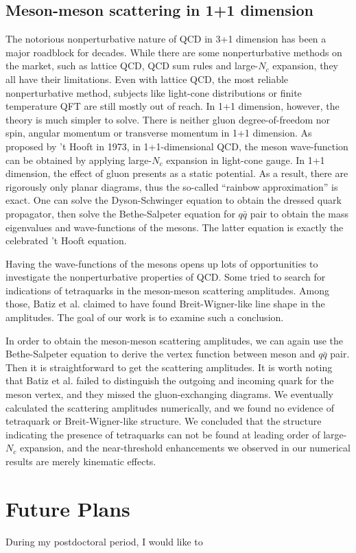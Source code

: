 \documentclass[letterpaper,11pt]{article}
\begin{document}
	\subsection*{Meson-meson scattering in 1+1 dimension}
	The notorious nonperturbative nature of QCD in 3+1 dimension has been a major roadblock for decades. While there are some nonperturbative methods on the market, such as lattice QCD, QCD sum rules and large-$N_c$ expansion, they all have their limitations. Even with lattice QCD, the most reliable nonperturbative method, subjects like light-cone distributions or finite temperature QFT are still mostly out of reach. In 1+1 dimension, however, the theory is much simpler to solve. There is neither gluon degree-of-freedom nor spin, angular momentum or transverse momentum in 1+1 dimension. As proposed by 't Hooft in 1973, in 1+1-dimensional QCD, the meson wave-function can be obtained by applying large-$N_c$ expansion in light-cone gauge. In 1+1 dimension, the effect of gluon presents as a static potential. As a result, there are rigorously only planar diagrams, thus the so-called “rainbow approximation” is exact. One can solve the Dyson-Schwinger equation to obtain the dressed quark propagator, then solve the Bethe-Salpeter equation for $q\bar q$ pair to obtain the mass eigenvalues and wave-functions of the mesons. The latter equation is exactly the celebrated 't Hooft equation. 

    Having the wave-functions of the mesons opens up lots of opportunities to investigate the nonperturbative properties of QCD. Some tried to search for indications of tetraquarks in the meson-meson scattering amplitudes. Among those, Batiz et al. claimed to have found Breit-Wigner-like line shape in the amplitudes. The goal of our work is to examine such a conclusion. 

    In order to obtain the meson-meson scattering amplitudes, we can again use the Bethe-Salpeter equation to derive the vertex function between meson and $q\bar q$ pair. Then it is straightforward to get the scattering amplitudes. It is worth noting that Batiz et al. failed to distinguish the outgoing and incoming quark for the meson vertex, and they missed the gluon-exchanging diagrams. We eventually calculated the scattering amplitudes numerically, and we found no evidence of tetraquark or Breit-Wigner-like structure. We concluded that the structure indicating the presence of tetraquarks can not be found at leading order of large-$N_c$ expansion, and the near-threshold enhancements we observed in our numerical results are merely kinematic effects. 

	\section*{Future Plans}
	During my postdoctoral period, I would like to 

	
	
\end{document}
